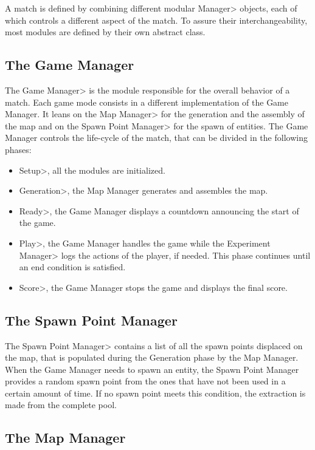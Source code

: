 \par

A match is defined by combining different modular \<Manager> objects, each of which controls a different aspect of the match. To assure their interchangeability, most modules are defined by their own abstract class.

\subsection{The Game Manager}

The \<Game Manager> is the module responsible for the overall behavior of a match. Each game mode consists in a different implementation of the Game Manager. It leans on the \<Map Manager> for the generation and the assembly of the map and on the \<Spawn Point Manager> for the spawn of entities. The Game Manager controls the life-cycle of the match, that can be divided in the following phases:

\begin{itemize}
\item \<Setup>, all the modules are initialized.
\item \<Generation>, the Map Manager generates and assembles the map.
\item \<Ready>, the Game Manager displays a countdown announcing the start of the game.
\item \<Play>, the Game Manager handles the game while the \<Experiment Manager> logs the actions of the player, if needed. This phase continues until an end condition is satisfied.
\item \<Score>, the Game Manager stops the game and displays the final score.
\end{itemize}

\subsection{The Spawn Point Manager}

The \<Spawn Point Manager> contains a list of all the spawn points displaced on the map, that is populated during the Generation phase by the Map Manager. When the Game Manager needs to spawn an entity, the Spawn Point Manager provides a random spawn point from the ones that have not been used in a certain amount of time. If no spawn point meets this condition, the extraction is made from the complete pool.

\subsection{The Map Manager}

